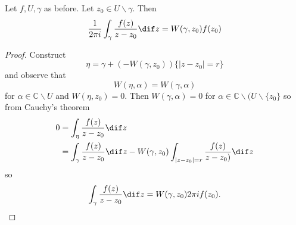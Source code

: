 \begin{theorem}
Let $f, U, \gamma$ as before. Let $z_0 \in U \backslash \gamma$. Then
$$
  \frac{1}{2 \pi i}
  \int_\gamma
    \frac{f(z)}
         {z - z_0}
    \dif z
= W(\gamma, z_0) f(z_0)
$$
\end{theorem}

\begin{proof}
Construct 
$$
\eta = \gamma + (-W(\gamma, z_0)) \{ |z - z_0| = r \}
$$
and observe that
$$
W(\eta, \alpha) = W(\gamma, \alpha)
$$
for $\alpha \in \mathbb{C} \backslash U$
and $W(\eta, z_0) = 0$. Then $W(\gamma, \alpha) = 0$ for
$\alpha \in \mathbb{C} \backslash (U \backslash \{ z_0 \}$
so from Cauchy's theorem
\begin{align*}
   0 
&= \int_\eta   \frac{f(z)}{z - z_0} \dif z \\
&= \int_\gamma \frac{f(z)}{z - z_0} \dif z
 - W(\gamma, z_0) \int_{|z - z_0| = r} \frac{f(z)}{z - z_0)} \dif z
\end{align*}
so
$$
\int_\gamma \frac{f(z)}{z - z_0} \dif z = W(\gamma, z_0) 2 \pi i f(z_0).
$$
\end{proof}
